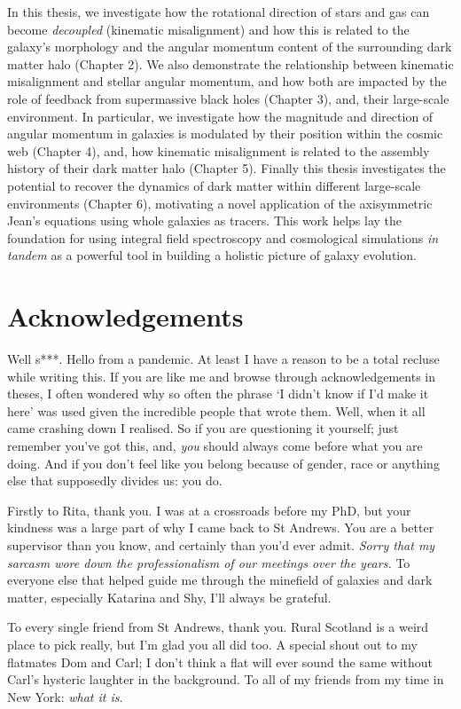 \documentclass[11pt]{book}
\begin{document}
In this thesis, we investigate how the rotational direction of stars and gas can become \textit{decoupled} (kinematic misalignment) and how this is related to the galaxy's morphology and the angular momentum content of the surrounding dark matter halo (Chapter 2). We also demonstrate the relationship between kinematic misalignment and stellar angular momentum, and how both are impacted by the role of feedback from supermassive black holes (Chapter 3), and, their large-scale environment. In particular, we investigate how the magnitude and direction of angular momentum in galaxies is modulated by their position within the cosmic web (Chapter 4), and, how kinematic misalignment is related to the assembly history of their dark matter halo (Chapter 5). Finally this thesis investigates the potential to recover the dynamics of dark matter within different large-scale environments (Chapter 6), motivating a novel application of the axisymmetric Jean's equations using whole galaxies as tracers. This work helps lay the foundation for using integral field spectroscopy and cosmological simulations \textit{in tandem} as a powerful tool in building a holistic picture of galaxy evolution.

\chapter{Acknowledgements}

Well s***. Hello from a pandemic. At least I have a reason to be a total recluse while writing this. If you are like me and browse through acknowledgements in theses, I often wondered why so often the phrase `I didn't know if I'd make it here' was used given the incredible people that wrote them. Well, when it all came crashing down I realised. So if you are questioning it yourself; just remember you've got this, and, \textit{you} should always come before what you are doing. And if you don't feel like you belong because of gender, race or anything else that supposedly divides us: you do. 

Firstly to Rita, thank you. I was at a crossroads before my PhD, but your kindness was a large part of why I came back to St Andrews. You are a better supervisor than you know, and certainly than you'd ever admit. \textit{Sorry that my sarcasm wore down the professionalism of our meetings over the years.} To everyone else that helped guide me through the minefield of galaxies and dark matter, especially Katarina and Shy, I'll always be grateful.

To every single friend from St Andrews, thank you. Rural Scotland is a weird place to pick really, but I'm glad you all did too. A special shout out to my flatmates Dom and Carl; I don't think a flat will ever sound the same without Carl's hysteric laughter in the background. To all of my friends from my time in New York: \textit{what it is}. 
\end{document}
